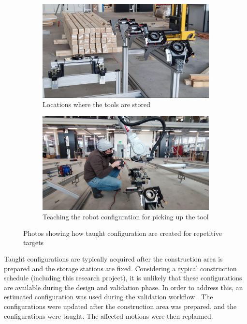\begin{figure}[!h]
    \centering
    \begin{subfigure}[b]{0.49\textwidth}
        \centering
        \includegraphics[width=\textwidth]{images/6a/img58.jpg}
        \caption{Locations where the tools are stored}
        \label{fig:tool-storage-location}
    \end{subfigure}
    \hfill
    \begin{subfigure}[b]{0.49\textwidth}
        \centering
        \includegraphics[width=\textwidth]{images/6a/img59.jpg}
        \caption{Teaching the robot configuration for picking up the tool}
        \label{fig:teaching-robot-configuration}
    \end{subfigure}
    \caption{Photos showing how taught configuration are created for repetitive targets}
    \label{fig:taught-configurations}
\end{figure}

Taught configurations are typically acquired after the construction area is prepared and the storage stations are fixed. Considering a typical construction schedule (including this research project), it is unlikely that these configurations are available during the design and validation phase. In order to address this, an estimated configuration was used during the validation workflow . The configurations were updated after the construction area was prepared, and the configurations were taught. The affected motions were then replanned.

